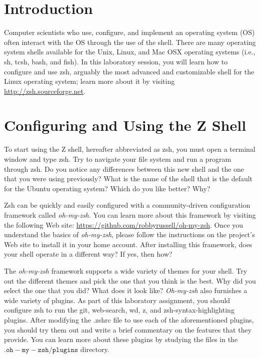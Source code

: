 





\section{Introduction}

Computer scientists who use, configure, and implement an operating system (OS) often interact
with the OS through the use of the shell. There are many operating system shells available for the
Unix, Linux, and Mac OSX operating systems (i.e., sh, tcsh, bash, and fish). In this laboratory
session, you will learn how to configure and use zsh, arguably the most advanced and customizable
shell for the Linux operating system; learn more about it by visiting \url{http://zsh.sourceforge.net}.

\section{Configuring and Using the Z Shell}


To start using the Z shell, hereafter abbreviated as zsh, you must open a terminal window and
type zsh. Try to navigate your file system and run a program through zsh. Do you notice any
differences between this new shell and the one that you were using previously? What is the name
of the shell that is the default for the Ubuntu operating system? Which do you like better? Why?


Zsh can be quickly and easily configured with a community-driven configuration framework
called \emph{oh-my-zsh}. You can learn more about this framework by visiting the following Web site:
\url{https://github.com/robbyrussell/oh-my-zsh}. Once you understand the basics of \emph{oh-my-zsh}, please follow the instructions on the project’s Web site to install it in your home account. After
installing this framework, does your shell operate in a different way? If yes, then how?


The \emph{oh-my-zsh} framework supports a wide variety of themes for your shell. Try out the different themes and pick the one that you think is the best. Why did you select the one that you did? What does it look like? \emph{Oh-my-zsh} also furnishes a wide variety of plugins. As part of this laboratory assignment, you should configure zsh to run the git, web-search, wd, z, and zsh-syntax-highlighting plugins. After modifying the .zshrc file to use each of the aforementioned plugins, you should try them out and write a brief commentary on the features that they provide. You can learn more about these plugins by studying the files in the $\mathtt{.oh-my-zsh/plugins}$ directory.


